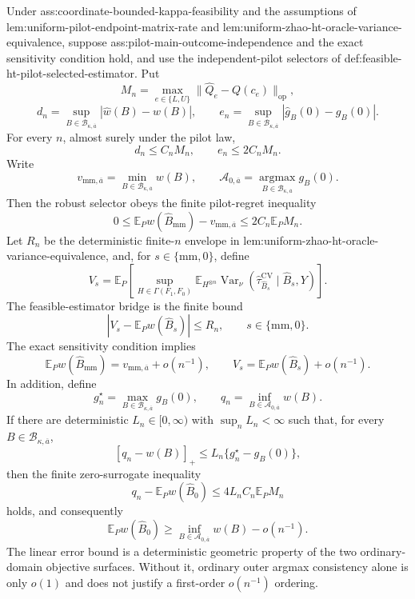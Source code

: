 Under ass:coordinate-bounded-kappa-feasibility and the assumptions of lem:uniform-pilot-endpoint-matrix-rate and lem:uniform-zhao-ht-oracle-variance-equivalence, suppose ass:pilot-main-outcome-independence and the exact sensitivity condition hold, and use the independent-pilot selectors of def:feasible-ht-pilot-selected-estimator.  Put
\[
M_n=\max_{e\in\{L,U\}}\lVert\widehat Q_e-Q(c_e)\rVert_{\mathrm{op}},
\]
\[
d_n=\sup_{B\in\mathcal B_{\kappa,\overline a}}|\widehat w(B)-w(B)|,
\qquad
e_n=\sup_{B\in\mathcal B_{\kappa,\overline a}}|\widehat g_B(0)-g_B(0)|.
\]
For every \(n\), almost surely under the pilot law,
\[
d_n\le C_nM_n,
\qquad e_n\le2C_nM_n.
\]
Write
\[
v_{\mathrm{mm},\overline a}=\min_{B\in\mathcal B_{\kappa,\overline a}}w(B),
\qquad
\mathcal A_{0,\overline a}=\operatorname*{argmax}_{B\in\mathcal B_{\kappa,\overline a}}g_B(0).
\]
Then the robust selector obeys the finite pilot-regret inequality
\[
0\le
\mathbb E_Pw(\widehat B_{\mathrm{mm}})-v_{\mathrm{mm},\overline a}
\le2C_n\mathbb E_PM_n.
\]
Let \(R_n\) be the deterministic finite-\(n\) envelope in lem:uniform-zhao-ht-oracle-variance-equivalence, and, for \(s\in\{\mathrm{mm},0\}\), define
\[
V_s=
\mathbb E_P\left[
\sup_{H\in\Gamma(F_1,F_0)}
\mathbb E_{H^{\otimes n}}
\operatorname{Var}_\nu
(\widehat\tau_{\widehat B_s}^{\mathrm{CV}}\mid\widehat B_s,Y)
\right].
\]
The feasible-estimator bridge is the finite bound
\[
|V_s-\mathbb E_Pw(\widehat B_s)|\le R_n,
\qquad s\in\{\mathrm{mm},0\}.
\]
The exact sensitivity condition implies
\[
\mathbb E_Pw(\widehat B_{\mathrm{mm}})
=v_{\mathrm{mm},\overline a}+o(n^{-1}),
\qquad
V_s=\mathbb E_Pw(\widehat B_s)+o(n^{-1}).
\]
In addition, define
\[
g_n^\star=\max_{B\in\mathcal B_{\kappa,\overline a}}g_B(0),
\qquad
q_n=\inf_{B\in\mathcal A_{0,\overline a}}w(B).
\]
If there are deterministic \(L_n\in[0,\infty)\) with \(\sup_nL_n<\infty\) such that, for every \(B\in\mathcal B_{\kappa,\overline a}\),
\[
[q_n-w(B)]_+\le L_n\{g_n^\star-g_B(0)\},
\]
then the finite zero-surrogate inequality
\[
q_n-\mathbb E_Pw(\widehat B_0)
\le4L_nC_n\mathbb E_PM_n
\]
holds, and consequently
\[
\mathbb E_Pw(\widehat B_0)
\ge\inf_{B\in\mathcal A_{0,\overline a}}w(B)-o(n^{-1}).
\]
The linear error bound is a deterministic geometric property of the two ordinary-domain objective surfaces.  Without it, ordinary outer argmax consistency alone is only \(o(1)\) and does not justify a first-order \(o(n^{-1})\) ordering.